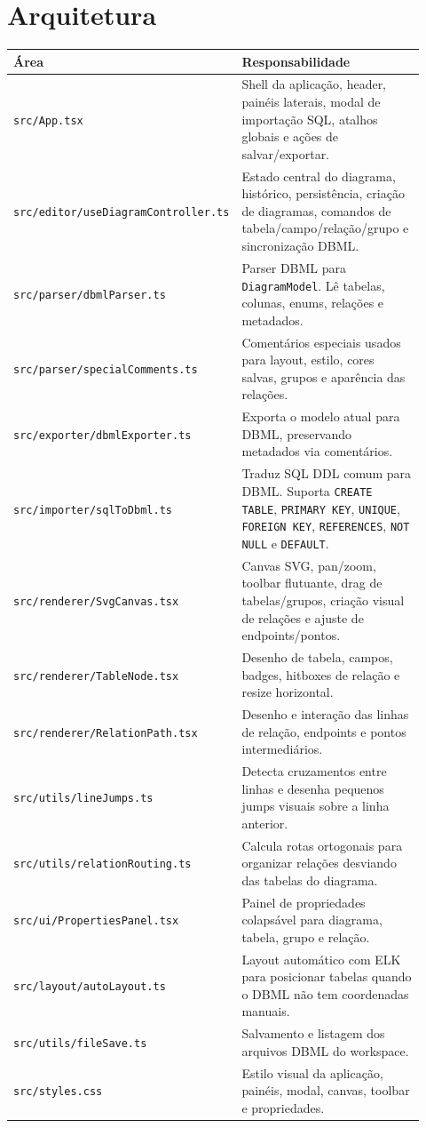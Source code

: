 \documentclass[11pt,a4paper]{article}
\begin{document}
\section{Arquitetura}

\begin{longtable}{p{0.28\linewidth} p{0.64\linewidth}}
\textbf{Área} & \textbf{Responsabilidade} \\
\hline
\texttt{src/App.tsx} & Shell da aplicação, header, painéis laterais, modal de importação SQL, atalhos globais e ações de salvar/exportar. \\
\texttt{src/editor/useDiagramController.ts} & Estado central do diagrama, histórico, persistência, criação de diagramas, comandos de tabela/campo/relação/grupo e sincronização DBML. \\
\texttt{src/parser/dbmlParser.ts} & Parser DBML para \texttt{DiagramModel}. Lê tabelas, colunas, enums, relações e metadados. \\
\texttt{src/parser/specialComments.ts} & Comentários especiais usados para layout, estilo, cores salvas, grupos e aparência das relações. \\
\texttt{src/exporter/dbmlExporter.ts} & Exporta o modelo atual para DBML, preservando metadados via comentários. \\
\texttt{src/importer/sqlToDbml.ts} & Traduz SQL DDL comum para DBML. Suporta \texttt{CREATE TABLE}, \texttt{PRIMARY KEY}, \texttt{UNIQUE}, \texttt{FOREIGN KEY}, \texttt{REFERENCES}, \texttt{NOT NULL} e \texttt{DEFAULT}. \\
\texttt{src/renderer/SvgCanvas.tsx} & Canvas SVG, pan/zoom, toolbar flutuante, drag de tabelas/grupos, criação visual de relações e ajuste de endpoints/pontos. \\
\texttt{src/renderer/TableNode.tsx} & Desenho de tabela, campos, badges, hitboxes de relação e resize horizontal. \\
\texttt{src/renderer/RelationPath.tsx} & Desenho e interação das linhas de relação, endpoints e pontos intermediários. \\
\texttt{src/utils/lineJumps.ts} & Detecta cruzamentos entre linhas e desenha pequenos jumps visuais sobre a linha anterior. \\
\texttt{src/utils/relationRouting.ts} & Calcula rotas ortogonais para organizar relações desviando das tabelas do diagrama. \\
\texttt{src/ui/PropertiesPanel.tsx} & Painel de propriedades colapsável para diagrama, tabela, grupo e relação. \\
\texttt{src/layout/autoLayout.ts} & Layout automático com ELK para posicionar tabelas quando o DBML não tem coordenadas manuais. \\
\texttt{src/utils/fileSave.ts} & Salvamento e listagem dos arquivos DBML do workspace. \\
\texttt{src/styles.css} & Estilo visual da aplicação, painéis, modal, canvas, toolbar e propriedades. \\
\end{longtable}
\end{document}
